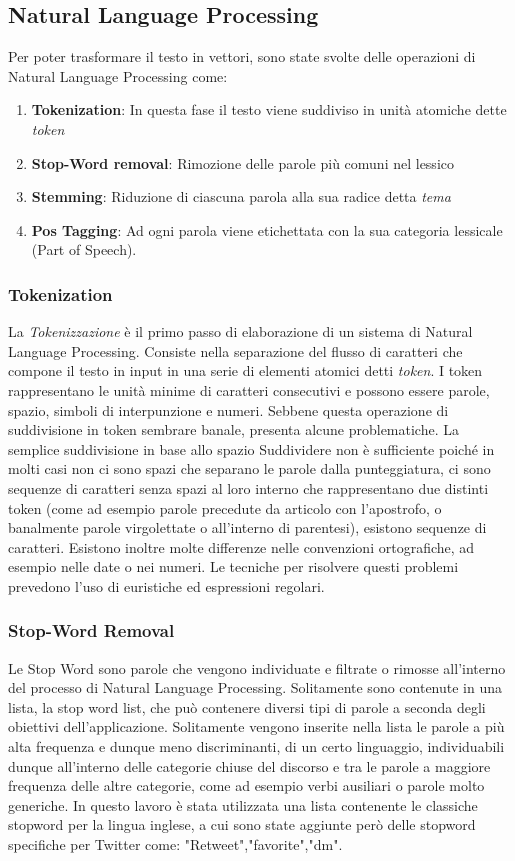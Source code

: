 \subsection{Natural Language Processing}
Per poter trasformare il testo in vettori, sono state svolte delle operazioni di Natural Language Processing come:
\begin{enumerate}
\item \textbf{Tokenization}: In questa fase il testo viene suddiviso in unità atomiche dette \emph{token}
\item \textbf{Stop-Word removal}: Rimozione delle parole più comuni nel lessico
\item \textbf{Stemming}: Riduzione di ciascuna parola alla sua radice detta \emph{tema}
\item \textbf{Pos Tagging}: Ad ogni parola viene etichettata con la sua categoria lessicale (Part of Speech).
\end{enumerate}
\subsubsection{Tokenization}

La \emph{Tokenizzazione} è il primo passo di elaborazione di un sistema di Natural Language
Processing. Consiste nella separazione del flusso di caratteri che compone il testo
in input in una serie di elementi atomici detti \emph{token}. I token rappresentano le
unità minime di caratteri consecutivi e possono essere parole, spazio, simboli di
interpunzione e numeri. Sebbene questa operazione di suddivisione in token 
sembrare banale, presenta alcune problematiche. La semplice suddivisione in base allo spazio Suddividere non è sufficiente poiché in molti casi non
ci sono spazi che separano le parole dalla punteggiatura, ci sono sequenze di caratteri senza spazi al loro interno che rappresentano due distinti token (come ad esempio parole precedute da articolo con l'apostrofo, o banalmente parole virgolettate o all'interno di parentesi), esistono sequenze di caratteri. Esistono inoltre molte differenze nelle convenzioni ortografiche, ad esempio nelle date o nei numeri. 
Le tecniche per risolvere questi problemi prevedono l'uso di euristiche ed  espressioni regolari.
 
\subsubsection{Stop-Word Removal}

Le Stop Word sono parole che vengono individuate e filtrate o rimosse all'interno del processo di Natural Language Processing. Solitamente sono contenute in una lista, la stop word list, che può contenere diversi tipi di parole a seconda degli obiettivi dell'applicazione. Solitamente vengono inserite nella lista le parole a più alta frequenza e dunque meno discriminanti, di un certo linguaggio, individuabili dunque all'interno delle categorie chiuse del discorso e tra le parole a maggiore frequenza
delle altre categorie, come ad esempio verbi ausiliari o parole molto generiche. In questo lavoro è stata utilizzata una lista contenente le classiche stopword per la lingua inglese, a cui sono state aggiunte però
delle stopword specifiche per Twitter come: "Retweet","favorite","dm".
